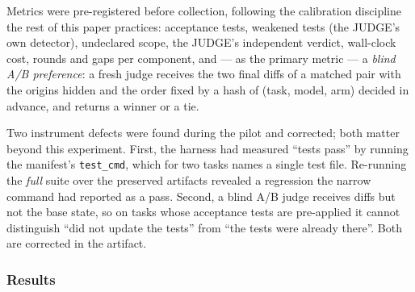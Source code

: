 \documentclass[11pt]{article}
\begin{document}
Metrics were pre-registered before collection, following the calibration
discipline the rest of this paper practices: acceptance tests, weakened tests
(the JUDGE's own detector), undeclared scope, the JUDGE's independent verdict,
wall-clock cost, rounds and gaps per component, and --- as the primary metric
--- a \emph{blind A/B preference}: a fresh judge receives the two final diffs of
a matched pair with the origins hidden and the order fixed by a hash of
(task, model, arm) decided in advance, and returns a winner or a tie.

Two instrument defects were found during the pilot and corrected; both matter
beyond this experiment. First, the harness had measured ``tests pass'' by
running the manifest's \texttt{test\_cmd}, which for two tasks names a single
test file. Re-running the \emph{full} suite over the preserved artifacts
revealed a regression the narrow command had reported as a pass. Second, a
blind A/B judge receives diffs but not the base state, so on tasks whose
acceptance tests are pre-applied it cannot distinguish ``did not update the
tests'' from ``the tests were already there''. Both are corrected in the
artifact.

\subsubsection{Results}

\begin{table}[!ht]
\caption{Exploratory pilot: 4 tasks, two models, three arms, one session per
cell (24 sessions). \emph{Regr.} counts sessions introducing failures that the
baseline did not have, and \emph{healed} counts sessions fixing pre-existing
baseline failures, both measured by the full suite; baselines had 1, 1, 8, and
5 failures on the four tasks. \emph{Weak.} is weakened tests by the JUDGE's
detector; \emph{undecl.} is changed files absent from the session's own
declaration; \emph{JUDGE} reports the independent review pass. Times are
medians with the observed range.}
\centering
\footnotesize
{}
\label{tab:gauntlet-pilot}
\end{table}
\end{document}
